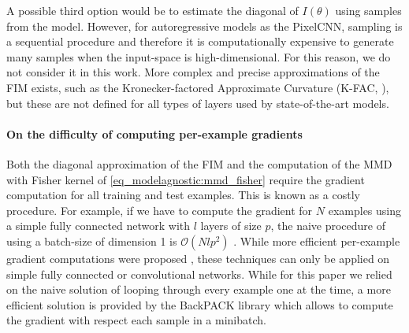 {A possible third option would be to estimate the diagonal of $I(\theta)$ using samples from the model. However, for autoregressive models as the PixelCNN, sampling is a sequential procedure and therefore it is computationally expensive to generate many samples when the input-space is high-dimensional. For this reason, we do not consider it in this work. More complex and precise approximations of the FIM exists, such as the Kronecker-factored Approximate Curvature (K-FAC, \citealp{martens_optimizing_2015}), but these are not defined for all types of layers used by state-of-the-art models.

\paragraph{On the difficulty of computing per-example gradients} Both the diagonal approximation of the FIM and the computation of the MMD with Fisher kernel of \cref{eq_modelagnostic:mmd_fisher} require the gradient computation for all training and test examples. This is known as a costly procedure. For example, if we have to compute the gradient for $N$ examples using a simple fully connected network with $l$ layers of size $p$, the naive procedure of using a batch-size of dimension 1 is $\mathcal{O}(Nlp^2)$ \parencite{goodfellow_efficient_2015}. While more efficient per-example gradient computations were proposed \parencite{goodfellow_efficient_2015, rochette_efficient_2019}, these techniques can only be applied on simple fully connected or convolutional networks. While for this paper we relied on the naive solution of looping through every example one at the time, a more efficient solution is provided by the BackPACK library \parencite{dangel_backpack_2020} which allows to compute the gradient with respect each sample in a minibatch. 

}
